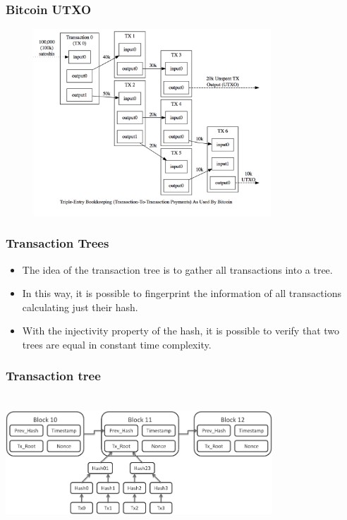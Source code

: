 \documentclass{beamer}
\begin{document}
\begin{frame}
  \frametitle{Bitcoin UTXO}
    \includegraphics[width=11cm, height=7cm]{utxo}
\end{frame}

\begin{frame}
   \frametitle{Transaction Trees}
   \begin{itemize}
     \item The idea of the transaction tree is to gather all transactions into a tree.
     \item In this way, it is possible to fingerprint the information of all transactions calculating just their hash.
     \item With the injectivity property of the hash, it is possible to verify that two trees are equal in constant time complexity.
   \end{itemize}
\end{frame}

\begin{frame}
  \frametitle{Transaction tree}
    \includegraphics[width=10cm, height=5cm]{blockchain}
\end{frame}
\end{document}
